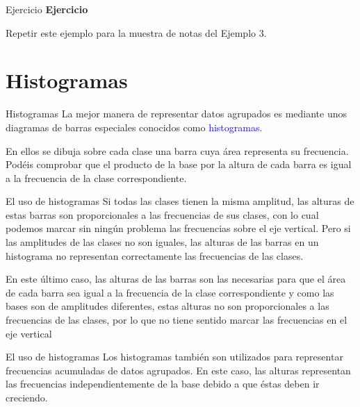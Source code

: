 \documentclass[
  ignorenonframetext,
  aspectratio=169]{beamer}
\newcommand\blue[1]{\textcolor{blue}{#1}}
\begin{document}
\begin{frame}{Ejercicio}
\protect\hypertarget{ejercicio-1}{}
\textbf{Ejercicio}

Repetir este ejemplo para la muestra de notas del Ejemplo 3.
\end{frame}

\hypertarget{histogramas}{%
\section{Histogramas}\label{histogramas}}

\begin{frame}{Histogramas}
\protect\hypertarget{histogramas-1}{}
La mejor manera de representar datos agrupados es mediante unos
diagramas de barras especiales conocidos como \blue{histogramas}.

En ellos se dibuja sobre cada clase una barra cuya área representa su
frecuencia. Podéis comprobar que el producto de la base por la altura de
cada barra es igual a la frecuencia de la clase correspondiente.
\end{frame}

\begin{frame}{El uso de histogramas}
\protect\hypertarget{el-uso-de-histogramas}{}
Si todas las clases tienen la misma amplitud, las alturas de estas
barras son proporcionales a las frecuencias de sus clases, con lo cual
podemos marcar sin ningún problema las frecuencias sobre el eje
vertical. Pero si las amplitudes de las clases no son iguales, las
alturas de las barras en un histograma no representan correctamente las
frecuencias de las clases.

En este último caso, las alturas de las barras son las necesarias para
que el área de cada barra sea igual a la frecuencia de la clase
correspondiente y como las bases son de amplitudes diferentes, estas
alturas no son proporcionales a las frecuencias de las clases, por lo
que no tiene sentido marcar las frecuencias en el eje vertical
\end{frame}

\begin{frame}{El uso de histogramas}
\protect\hypertarget{el-uso-de-histogramas-1}{}
Los histogramas también son utilizados para representar frecuencias
acumuladas de datos agrupados. En este caso, las alturas representan las
frecuencias independientemente de la base debido a que éstas deben ir
creciendo.
\end{frame}
\end{document}
